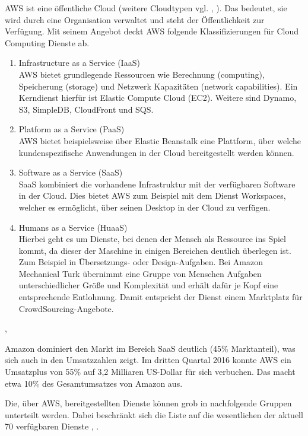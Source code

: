 AWS ist eine öffentliche Cloud (weitere Cloudtypen vgl. \cite{wittig:awsinaction}, \cite{baun:cloudcomp}). Das bedeutet, sie wird durch eine Organisation verwaltet und steht der Öffentlichkeit zur Verfügung. Mit seinem Angebot deckt AWS folgende Klassifizierungen für Cloud Computing Dienste ab.
\begin{enumerate}
  \item Infrastructure as a Service (IaaS)
  \\AWS bietet grundlegende Ressourcen wie Berechnung (computing), Speicherung (storage) und Netzwerk Kapazitäten (network capabilities). Ein Kerndienst hierfür ist Elastic Compute Cloud (EC2). Weitere sind Dynamo, S3, SimpleDB, CloudFront und SQS.
  \item Platform as a Service (PaaS)
  \\AWS bietet beispielsweise über Elastic Beanstalk eine Plattform, über welche kundenspezifische Anwendungen in der Cloud bereitgestellt werden können.
  \item Software as a Service (SaaS)
  \\SaaS kombiniert die vorhandene Infrastruktur mit der verfügbaren Software in der Cloud. Dies bietet AWS zum Beispiel mit dem Dienst Workspaces, welcher es ermöglicht, über seinen Desktop in der Cloud zu verfügen.
  \item Humans as a Service (HuaaS)
  \\ Hierbei geht es um Dienste, bei denen der Mensch als Ressource ins Spiel kommt, da dieser der Maschine in einigen Bereichen deutlich überlegen ist. Zum Beispiel in Übersetzungs- oder Design-Aufgaben. Bei Amazon Mechanical Turk übernimmt eine Gruppe von Menschen Aufgaben unterschiedlicher Größe und Komplexität und erhält dafür je Kopf eine entsprechende Entlohnung. Damit entspricht der Dienst einem Marktplatz für CrowdSourcing-Angebote.
\end{enumerate} \cite{wittig:awsinaction}, \cite{baun:cloudcomp}

Amazon dominiert den Markt im Bereich SaaS deutlich (45\% Marktanteil), was sich auch in den Umsatzzahlen zeigt. Im dritten Quartal 2016 konnte AWS ein Umsatzplus von 55\% auf 3,2 Milliaren US-Dollar für sich verbuchen. Das macht etwa 10\% des Gesamtumsatzes von Amazon aus. \cite{t3n:brien}

Die, über AWS, bereitgestellten Dienste können grob in nachfolgende Gruppen unterteilt werden. Dabei beschränkt sich die Liste auf die wesentlichen der aktuell 70 verfügbaren Dienste \cite{sendcheckit:plain}, \cite{aws:insider}.

